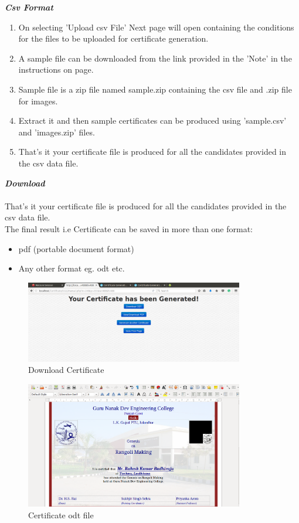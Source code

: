 \newpage
\textbf{\emph{Csv Format}}
\begin{enumerate}
\item On selecting 'Upload csv File' Next page will open containing the conditions for the files to be uploaded for certificate generation.
\item A sample file can be downloaded from the link provided in the 'Note' in the instructions on page.
\item Sample file is a zip file named sample.zip containing the csv file and .zip file for images.
\item Extract it and then sample certificates can be produced using 'sample.csv' and 'images.zip' files.
\item That's it your certificate file is produced for all the candidates provided in the csv data file.
\end{enumerate}  
\newpage
\textbf{\emph{Download}}\\\\
That's it your certificate file is produced for all the candidates provided in the csv data file.\\
The final result i.e Certificate can be saved in more than one format:
\begin{itemize}
\item pdf (portable document format)
\item Any other format eg. odt etc.
\end{itemize}
\begin{figure}[!ht]
\centering
\includegraphics[width=0.85\textwidth]{images/cgs/cgs6.png}                  
\caption{Download Certificate}
\hspace{-1.5em}
\end{figure}
\begin{figure}[!ht]
\centering
\includegraphics[width=0.85\textwidth]{images/cgs/cgs8.png}                 
\caption{Certificate odt file}
\hspace{-1.5em}
\end{figure}
